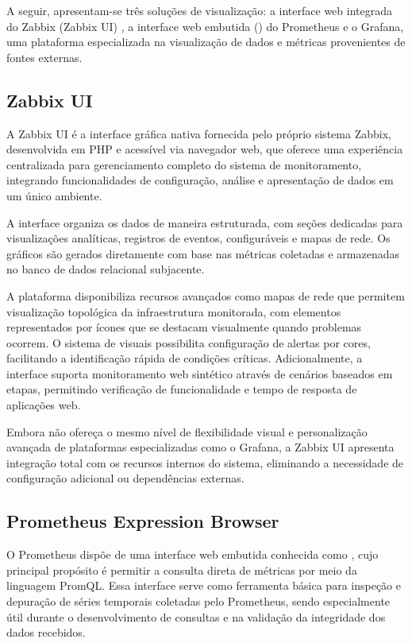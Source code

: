 A seguir, apresentam-se três soluções de visualização: a interface web integrada do Zabbix (Zabbix UI) , a interface web embutida () do Prometheus  e o Grafana, uma plataforma especializada na visualização de dados e métricas provenientes de fontes externas.

\subsection{Zabbix UI}
\label{subsection:ZabbixUI}

A Zabbix UI \citep{zabbix2025} é a interface gráfica nativa fornecida pelo próprio sistema Zabbix, desenvolvida em PHP e acessível via navegador web, que oferece uma experiência centralizada para gerenciamento completo do sistema de monitoramento, integrando funcionalidades de configuração, análise e apresentação de dados em um único ambiente.

A interface organiza os dados de maneira estruturada, com seções dedicadas para visualizações analíticas, registros de eventos,  configuráveis e mapas de rede. Os gráficos são gerados diretamente com base nas métricas coletadas e armazenadas no banco de dados relacional subjacente.

A plataforma disponibiliza recursos avançados como mapas de rede que permitem visualização topológica da infraestrutura monitorada, com elementos representados por ícones que se destacam visualmente quando problemas ocorrem. O sistema de  visuais possibilita configuração de alertas por cores, facilitando a identificação rápida de condições críticas. Adicionalmente, a interface suporta monitoramento web sintético através de cenários baseados em etapas, permitindo verificação de funcionalidade e tempo de resposta de aplicações web.

Embora não ofereça o mesmo nível de flexibilidade visual e personalização avançada de plataformas especializadas como o Grafana, a Zabbix UI apresenta integração total com os recursos internos do sistema, eliminando a necessidade de configuração adicional ou dependências externas.

\subsection{Prometheus Expression Browser}
\label{subsection:PrometheusExpressionBrowser}

O Prometheus dispõe de uma interface web embutida conhecida como  \citep{promexpbrwsr2025}, cujo principal propósito é permitir a consulta direta de métricas por meio da linguagem PromQL. Essa interface serve como ferramenta básica para inspeção e depuração de séries temporais coletadas pelo Prometheus, sendo especialmente útil durante o desenvolvimento de consultas e na validação da integridade dos dados recebidos.

